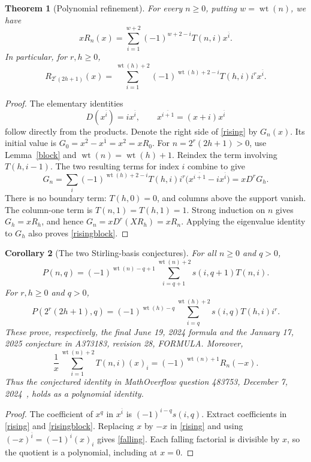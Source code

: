 \documentclass[11pt]{article}
\newcommand{\wt}{\operatorname{wt}}
\newtheorem{theorem}{Theorem}
\newtheorem{corollary}[theorem]{Corollary}
\begin{document}
\begin{theorem}[Polynomial refinement]\label{polynomial}
For every $n\geq0$, putting $w=\wt(n)$, we have
\begin{equation}\label{rising}
 xR_n(x)=\sum_{i=1}^{w+2}(-1)^{w+2-i}T(n,i)x^{\overline i}.
\end{equation}
In particular, for $r,h\geq0$,
\begin{equation}\label{risingblock}
 R_{2^r(2h+1)}(x)=\sum_{i=1}^{\wt(h)+2}
 (-1)^{\wt(h)+2-i}T(h,i)i^r x^{\overline i}.
\end{equation}
\end{theorem}
\begin{proof}
The elementary identities
\[
 D(x^{\overline i})=i x^{\overline i},\qquad
 x^{\overline{i+1}}=(x+i)x^{\overline i}
\]
follow directly from the products. Denote the right side of
\eqref{rising} by $G_n(x)$. Its initial value is
$G_0=x^{\overline2}-x^{\overline1}=x^2=xR_0$.
For $n=2^r(2h+1)>0$, use Lemma~\ref{block} and
$\wt(n)=\wt(h)+1$. Reindex the term involving $T(h,i-1)$.
The two resulting terms for index $i$ combine to give
\[
 G_n=\sum_i(-1)^{\wt(h)+2-i}T(h,i)i^r
       \bigl(x^{\overline{i+1}}-i x^{\overline i}\bigr)
     =xD^rG_h.
\]
There is no boundary term: $T(h,0)=0$, and columns above the support
vanish. The column-one term is $T(n,1)=T(h,1)=1$.
Strong induction on $n$ gives $G_h=xR_h$, and hence
$G_n=xD^r(XR_h)=xR_n$. Applying the eigenvalue identity to $G_h$
also proves \eqref{risingblock}.
\end{proof}

\begin{corollary}[The two Stirling-basis conjectures]\label{basis}
For all $n\geq0$ and $q>0$,
\begin{equation}\label{coefficient}
 P(n,q)=(-1)^{\wt(n)-q+1}
       \sum_{i=q+1}^{\wt(n)+2}s(i,q+1)T(n,i).
\end{equation}
For $r,h\geq0$ and $q>0$,
\begin{equation}\label{coefficientblock}
 P(2^r(2h+1),q)=(-1)^{\wt(h)-q}
       \sum_{i=q}^{\wt(h)+2}s(i,q)T(h,i)i^r.
\end{equation}
These prove, respectively, the final June 19, 2024 formula and the
January 17, 2025 conjecture in A373183, revision 28, FORMULA.
Moreover,
\begin{equation}\label{falling}
 \frac1x\sum_{i=1}^{\wt(n)+2}T(n,i)(x)_i
 =(-1)^{\wt(n)+1}R_n(-x).
\end{equation}
Thus the conjectured identity in MathOverflow question 483753,
December 7, 2024~\cite{mo}, holds as a polynomial identity.
\end{corollary}
\begin{proof}
The coefficient of $x^q$ in $x^{\overline i}$ is
$(-1)^{i-q}s(i,q)$. Extract coefficients in \eqref{rising} and
\eqref{risingblock}. Replacing $x$ by $-x$ in \eqref{rising} and
using $(-x)^{\overline i}=(-1)^i(x)_i$ gives \eqref{falling}.
Each falling factorial is divisible by $x$, so the quotient is a
polynomial, including at $x=0$.
\end{proof}
\end{document}

